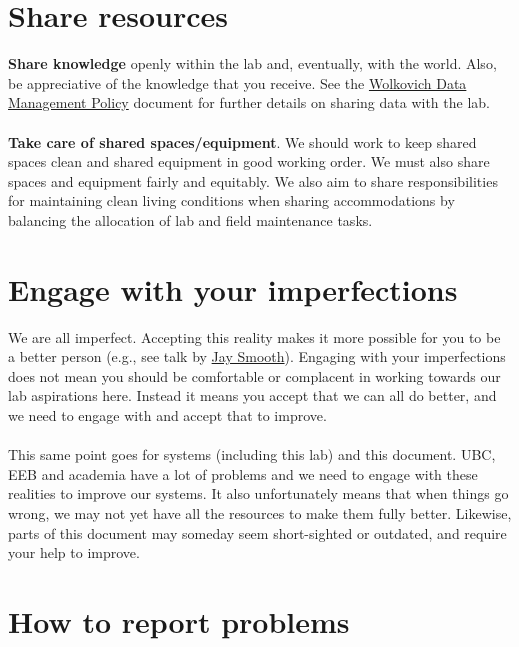 \documentclass[11pt,a4paper,oneside]{article}
\begin{document}
\section{Share resources}

\textbf{Share knowledge} openly within the lab and, eventually, with the world. Also, be appreciative of the knowledge that you receive. See the \href{https://github.com/temporalecologylab/labgit/blob/master/datacodemgmt/tempeco_DMP.pdf}{Wolkovich Data Management Policy} document for further details on sharing data with the lab.\\
\\
\noindent
\textbf{Take care of shared spaces/equipment}. We should work to keep shared spaces clean and shared equipment in good working order. We must also share spaces and equipment fairly and equitably. We also aim to share responsibilities for maintaining clean living conditions when sharing accommodations by balancing the allocation of lab and field maintenance tasks.

\section{Engage with your imperfections}

We are all imperfect. Accepting this reality makes it more possible for you to be a better person (e.g., see talk by \href{https://www.youtube.com/watch?v=MbdxeFcQtaU}{Jay Smooth}). Engaging with your imperfections does not mean you should be comfortable or complacent in working towards our lab aspirations here. Instead it means you accept that we can all do better, and we need to engage with and accept that to improve. \\
\\
\noindent
This same point goes for systems (including this lab) and this document. UBC, EEB and academia have a lot of problems and we need to engage with these realities to improve our systems. It also unfortunately means that when things go wrong, we may not yet have all the resources to make them fully better. Likewise, parts of this document may someday seem short-sighted or outdated, and require your help to improve.

\section*{How to report problems}
\end{document}
